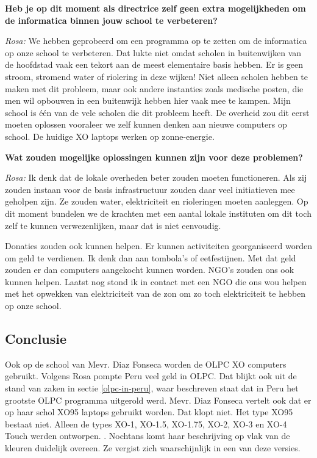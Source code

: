 \textbf{Heb je op dit moment als directrice zelf geen extra mogelijkheden om de informatica binnen jouw school te verbeteren?}

\textit{Rosa:} We hebben geprobeerd om een programma op te zetten om de informatica op onze school te verbeteren. Dat lukte niet omdat scholen in buitenwijken van de hoofdstad vaak een tekort aan de meest elementaire basis hebben. Er is geen stroom, stromend water of riolering in deze wijken! Niet alleen scholen hebben te maken met dit probleem, maar ook andere instanties zoals medische posten, die men wil opbouwen in een buitenwijk hebben hier vaak mee te kampen. Mijn school is één van de vele scholen die dit probleem heeft. De overheid zou dit eerst moeten oplossen vooraleer we zelf kunnen denken aan nieuwe computers op school. De huidige XO laptops werken op zonne-energie. 

\textbf{Wat zouden mogelijke oplossingen kunnen zijn voor deze problemen?}

\textit{Rosa:} Ik denk dat de lokale overheden beter zouden moeten functioneren. Als zij zouden instaan voor de basis infrastructuur zouden daar veel initiatieven mee geholpen zijn. Ze zouden water, elektriciteit en rioleringen moeten aanleggen. Op dit moment bundelen we de krachten met een aantal lokale instituten om dit toch zelf te kunnen verwezenlijken, maar dat is niet eenvoudig. 

Donaties zouden ook kunnen helpen. Er kunnen activiteiten georganiseerd worden om geld te verdienen. Ik denk dan aan tombola's of eetfestijnen. Met dat geld zouden er dan computers aangekocht kunnen worden. NGO's zouden ons ook kunnen helpen. Laatst nog stond ik in contact met een NGO die ons wou helpen met het opwekken van elektriciteit van de zon om zo toch elektriciteit te hebben op onze school.

\subsection{Conclusie}
Ook op de school van Mevr. Diaz Fonseca worden de OLPC XO computers gebruikt. Volgens Rosa pompte Peru veel geld in OLPC. Dat blijkt ook uit de stand van zaken in sectie \ref{olpc-in-peru}, waar beschreven staat dat in Peru het grootste OLPC programma uitgerold werd. Mevr. Diaz Fonseca vertelt ook dat er op haar schol XO95 laptops gebruikt worden. Dat klopt niet. Het type XO95 bestaat niet. Alleen de types XO-1, XO-1.5, XO-1.75, XO-2, XO-3 en XO-4 Touch werden ontworpen. \autocite{OLPC2016}. Nochtans komt haar beschrijving op vlak van de kleuren duidelijk overeen. Ze vergist zich waarschijnlijk in een van deze versies.

